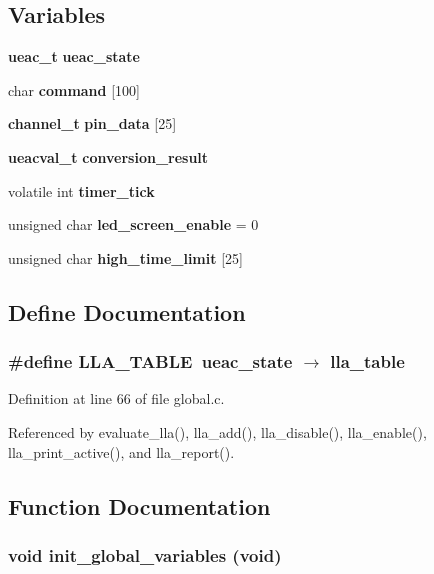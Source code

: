 \subsection*{Variables}
\begin{CompactItemize}
\item 
{\bf ueac\_\-t} {\bf ueac\_\-state}
\item 
char {\bf command} [100]
\item 
{\bf channel\_\-t} {\bf pin\_\-data} [25]
\item 
{\bf ueacval\_\-t} {\bf conversion\_\-result}
\item 
volatile int {\bf timer\_\-tick}
\item 
unsigned char {\bf led\_\-screen\_\-enable} = 0
\item 
unsigned char {\bf high\_\-time\_\-limit} [25]
\end{CompactItemize}


\subsection{Define Documentation}
\subsubsection{\setlength{\rightskip}{0pt plus 5cm}\#define LLA\_\-TABLE~{\bf ueac\_\-state} $\rightarrow$ lla\_\-table}\label{global_8c_a0}




Definition at line 66 of file global.c.

Referenced by evaluate\_\-lla(), lla\_\-add(), lla\_\-disable(), lla\_\-enable(), lla\_\-print\_\-active(), and lla\_\-report().

\subsection{Function Documentation}
\subsubsection{\setlength{\rightskip}{0pt plus 5cm}void init\_\-global\_\-variables (void)}\label{global_8c_a10}




